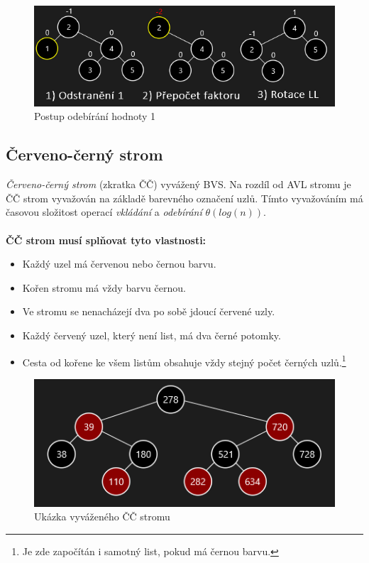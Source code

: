 \documentclass[
  biblatex=false,
  font=serif,
  glossaries=false,
  tables=false,
  theorems=false,
  index
]{kidiplom}
\begin{document}
\begin{figure}[h!]
\centering
	\includegraphics[scale=0.55]{obrazky/16AVLOdebirani.png}
	\caption{Postup odebírání hodnoty 1}
\end{figure}

\newpage
\subsection{Červeno-černý strom}
\indent\indent\textit{Červeno-černý strom} (zkratka ČČ) vyvážený BVS. Na rozdíl od AVL stromu je ČČ strom vyvažován na základě barevného označení uzlů. Tímto vyvažováním má časovou složitost operací \textit{vkládání} a \textit{odebírání} $\theta(log (n))$.\\
\indent\textit{}\cite{dvorsky}\\

\noindent\textbf{ČČ strom musí splňovat tyto vlastnosti:}
\begin{itemize}
\item Každý uzel má červenou nebo černou barvu.
\item Kořen stromu má vždy barvu černou.
\item Ve stromu se nenacházejí dva po sobě jdoucí červené uzly.
\item Každý červený uzel, který není list, má dva černé potomky.
\item Cesta od kořene ke všem listům obsahuje vždy stejný počet černých uzlů.\footnote{Je zde započítán i samotný list, pokud má černou barvu.} 
\end{itemize}

\begin{figure}[h!]
\centering
	\includegraphics[scale=1]{obrazky/17CCUkazka.png}
	\caption{Ukázka vyváženého ČČ stromu}
\end{figure}
\end{document}
